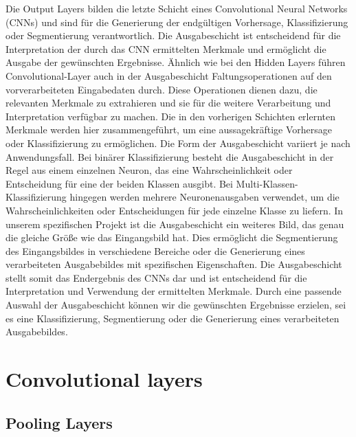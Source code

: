     Die Output Layers bilden die letzte Schicht eines Convolutional Neural Networks (CNNs) und sind für die Generierung der endgültigen Vorhersage, Klassifizierung oder Segmentierung verantwortlich. 
    Die Ausgabeschicht ist entscheidend für die Interpretation der durch das CNN ermittelten Merkmale und ermöglicht die Ausgabe der gewünschten Ergebnisse.
    Ähnlich wie bei den Hidden Layers führen Convolutional-Layer auch in der Ausgabeschicht Faltungsoperationen auf den vorverarbeiteten Eingabedaten durch. 
    Diese Operationen dienen dazu, die relevanten Merkmale zu extrahieren und sie für die weitere Verarbeitung und Interpretation verfügbar zu machen. Die in den vorherigen Schichten erlernten Merkmale werden hier zusammengeführt, um eine aussagekräftige Vorhersage oder Klassifizierung zu ermöglichen.
    Die Form der Ausgabeschicht variiert je nach Anwendungsfall. Bei binärer Klassifizierung besteht die Ausgabeschicht in der Regel aus einem einzelnen Neuron, das eine Wahrscheinlichkeit oder Entscheidung für eine der beiden Klassen ausgibt. 
    Bei Multi-Klassen-Klassifizierung hingegen werden mehrere Neuronenausgaben verwendet, um die Wahrscheinlichkeiten oder Entscheidungen für jede einzelne Klasse zu liefern.
    In unserem spezifischen Projekt ist die Ausgabeschicht ein weiteres Bild, das genau die gleiche Größe wie das Eingangsbild hat. 
    Dies ermöglicht die Segmentierung des Eingangsbildes in verschiedene Bereiche oder die Generierung eines verarbeiteten Ausgabebildes mit spezifischen Eigenschaften.
    Die Ausgabeschicht stellt somit das Endergebnis des CNNs dar und ist entscheidend für die Interpretation und Verwendung der ermittelten Merkmale. 
    Durch eine passende Auswahl der Ausgabeschicht können wir die gewünschten Ergebnisse erzielen, sei es eine Klassifizierung, Segmentierung oder die Generierung eines verarbeiteten Ausgabebildes.

\section{Convolutional layers}

\subsection{Pooling Layers}

